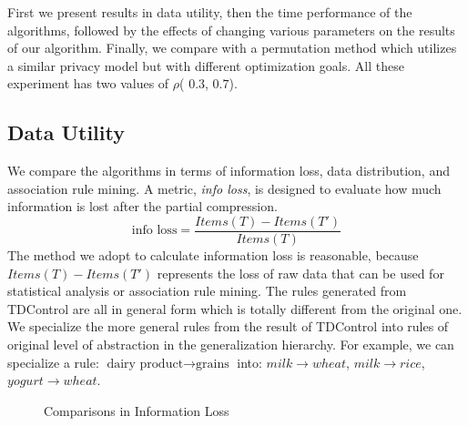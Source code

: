First we present results in data utility, then the
time performance of the algorithms, followed by the effects of
changing various parameters on the results of our algorithm.
Finally, we compare with a permutation method which utilizes
a similar privacy model but with different optimization goals.
All these experiment has two values of $\rho$(
$0.3$, $0.7$).


\subsection{Data Utility}\label{sec:eval:datautility}
We compare the algorithms in terms of information loss, data distribution,
and association rule mining. A metric, {\em info loss}, is designed to evaluate 
how much information is lost after the partial compression.
\[\text{info loss} = \frac{{Items(T) - Items(T')}}{{Items(T)}}\]
The method we adopt to calculate information loss is reasonable,
because ${Items(T) - Items(T')}$ represents the loss of raw data that
can be used for statistical analysis or association rule mining.
The rules generated from TDControl are all in general 
form which is totally different from the original one. 
We specialize the more general rules from 
the result of TDControl into rules of original level of abstraction 
in the generalization hierarchy. 
For example, we can specialize a rule: $\text{dairy product} \rightarrow  \text{grains}$ into: $milk \rightarrow wheat$, $milk \rightarrow rice$, $yogurt \rightarrow wheat$.


\begin{figure}[th]
\centering
{}
\hfill
{}
\caption{Comparisons in Information Loss}\label{fig:loss}
\end{figure}


